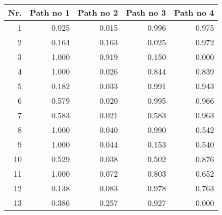 \begin{tabular}{|r|r|r|r|r|}
  \hline
  \textbf{Nr.}&  \textbf{Path no 1}&  \textbf{Path no 2}&  \textbf{Path no 3}&  \textbf{Path no 4}\\
  \hline
  1& 0.025& 0.015& 0.996& 0.975\\
  \hline
  2& 0.164& 0.163& 0.025& 0.972\\
  \hline
  3& 1.000& 0.919& 0.150& 0.000\\
  \hline
  4& 1.000& 0.026& 0.844& 0.839\\
  \hline
  5& 0.182& 0.033& 0.991& 0.943\\
  \hline
  6& 0.579& 0.020& 0.995& 0.966\\
  \hline
  7& 0.583& 0.021& 0.583& 0.963\\
  \hline
  8& 1.000& 0.040& 0.990& 0.542\\
  \hline
  9& 1.000& 0.044& 0.153& 0.540\\
  \hline
  10& 0.529& 0.038& 0.502& 0.876\\
  \hline
  11& 1.000& 0.072& 0.803& 0.652\\
  \hline
  12& 0.138& 0.083& 0.978& 0.763\\
  \hline
  13& 0.386& 0.257& 0.927& 0.000\\
  \hline
\end{tabular}
